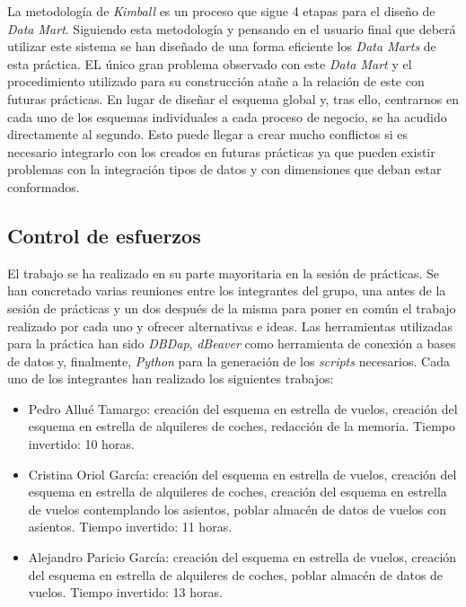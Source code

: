 \documentclass{article}
\begin{document}
La metodología de \textit{Kimball} es un proceso que sigue 4 etapas para el diseño de \textit{Data Mart}. Siguiendo esta metodología y pensando en el usuario final que deberá utilizar este sistema se han diseñado de una forma eficiente los \textit{Data Marts} de esta práctica.
EL único gran problema observado con este \textit{Data Mart} y el procedimiento utilizado para su construcción atañe a la relación de este con futuras prácticas. En lugar de diseñar el esquema global y, tras ello, centrarnos en cada uno de los esquemas individuales a cada proceso de negocio, se ha acudido directamente al segundo. Esto puede llegar a crear mucho conflictos si es necesario integrarlo con los creados en futuras prácticas ya que pueden existir problemas con la integración tipos de datos y con dimensiones que deban estar conformados.\\

\subsection{Control de esfuerzos}

El trabajo se ha realizado en su parte mayoritaria en la sesión de prácticas. Se han concretado varias reuniones entre los integrantes del grupo, una antes de la sesión de prácticas y un dos después de la misma para poner en común el trabajo realizado por cada uno y ofrecer alternativas e ideas. Las herramientas utilizadas para la práctica han sido \textit{DBDap}, \textit{dBeaver} como herramienta de conexión a bases de datos y, finalmente, \textit{Python} para la generación de los \textit{scripts} necesarios. Cada uno de los integrantes han realizado los siguientes trabajos:

\begin{itemize}
    \item Pedro Allué Tamargo: creación del esquema en estrella de vuelos, creación del esquema en estrella de alquileres de coches, redacción de la memoria. Tiempo invertido: 10 horas.
    \item Cristina Oriol García: creación del esquema en estrella de vuelos, creación del esquema en estrella de alquileres de coches, creación del esquema en estrella de vuelos contemplando los asientos, poblar almacén de datos de vuelos con asientos. Tiempo invertido: 11 horas.
    \item Alejandro Paricio García: creación del esquema en estrella de vuelos, creación del esquema en estrella de alquileres de coches, poblar almacén de datos de vuelos. Tiempo invertido: 13 horas.
\end{itemize}
\end{document}
